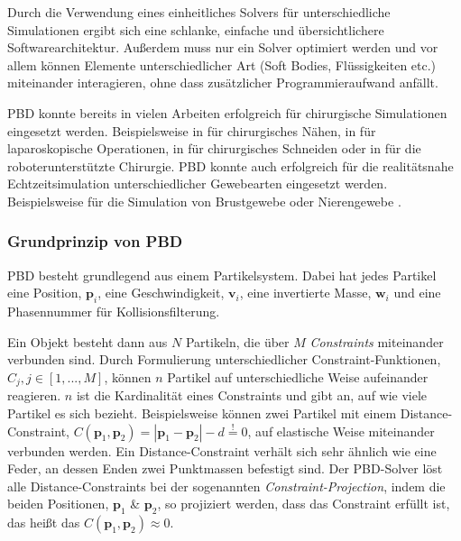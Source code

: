 Durch die Verwendung eines einheitliches Solvers für unterschiedliche Simulationen ergibt sich eine schlanke, einfache und übersichtlichere Softwarearchitektur. Außerdem muss nur ein Solver optimiert werden und vor allem können Elemente unterschiedlicher Art (Soft Bodies, Flüssigkeiten etc.) miteinander interagieren, ohne dass zusätzlicher Programmieraufwand anfällt.

PBD konnte bereits in vielen Arbeiten erfolgreich für chirurgische Simulationen eingesetzt werden. Beispielsweise in \cite{PBDThread} für chirurgisches Nähen, in \cite{VRLaparoscop} für laparoskopische Operationen, in \cite{PBDCutting} für chirurgisches Schneiden oder in \cite{VRRobSim} für die roboterunterstützte Chirurgie. 
PBD konnte auch erfolgreich für die realitätsnahe Echtzeitsimulation unterschiedlicher Gewebearten eingesetzt werden. Beispielsweise für die Simulation von Brustgewebe \cite{BreastBiopsy} oder Nierengewebe \cite{PBDKidney}.

\subsubsection{Grundprinzip von PBD}

\ac{PBD} besteht grundlegend aus einem Partikelsystem. Dabei hat jedes Partikel eine Position, $\textbf{p}_i$, eine Geschwindigkeit, $\textbf{v}_i$, eine invertierte Masse, $\textbf{w}_i$ und eine Phasennummer für Kollisionsfilterung. 

Ein Objekt besteht dann aus $N$ Partikeln, die über $M$ \textit{Constraints} miteinander verbunden sind. Durch Formulierung unterschiedlicher Constraint-Funktionen, $C_j, j \in [1,...,M] $, können $n$ Partikel auf unterschiedliche Weise aufeinander reagieren. $n$ ist die Kardinalität eines Constraints und gibt an, auf wie viele Partikel es sich bezieht.
Beispielsweise können zwei Partikel mit einem Distance-Constraint, $C(\textbf{p}_1,\textbf{p}_2) = |\textbf{p}_1-\textbf{p}_2|-d \stackrel{!}{=} 0$, auf elastische Weise miteinander verbunden werden. Ein Distance-Constraint verhält sich sehr ähnlich wie eine Feder, an dessen Enden zwei Punktmassen befestigt sind. 
Der PBD-Solver löst alle Distance-Constraints bei der sogenannten \textit{Constraint-Projection}, indem die beiden Positionen, $\textbf{p}_1$ \& $\textbf{p}_2$, so projiziert werden, dass das Constraint erfüllt ist, das heißt das $C(\textbf{p}_1,\textbf{p}_2) \approx 0$. 

